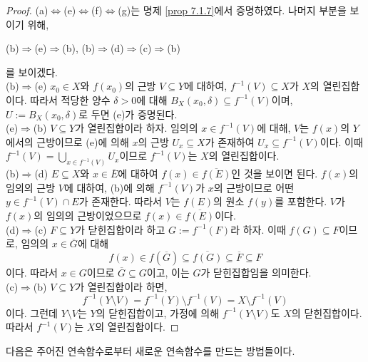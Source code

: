 \documentclass[11pt]{book}
\numberwithin{equation}{chapter}
\theoremstyle{definition}
\begin{document}
\begin{proof}
    (a)\(\Leftrightarrow\)(e)\(\Leftrightarrow\)(f)\(\Leftrightarrow\)(g)는 명제 \ref{prop 7.1.7}에서 증명하였다. 나머지 부분을 보이기 위해,
    \begin{center}
        (b)\(\Rightarrow\)(e)\(\Rightarrow\)(b), \quad (b)\(\Rightarrow\)(d)\(\Rightarrow\)(c)\(\Rightarrow\)(b)
    \end{center}
    를 보이겠다.\\
    (b)\(\Rightarrow\)(e) \(x_0 \in X\)와 \(f(x_0)\)의 근방 \(V \subseteq Y\)에 대하여, \(f^{-1}(V) \subseteq X\)가 \(X\)의 열린집합이다. 따라서 적당한 양수 \(\delta > 0\)에 대해 \(B_X(x_0, \delta) \subseteq f^{-1}(V)\)이며, \(U := B_X(x_0, \delta)\)로 두면 (e)가 증명된다.\\
    (e)\(\Rightarrow\)(b) \(V \subseteq Y\)가 열린집합이라 하자. 임의의 \(x \in f^{-1}(V)\)에 대해, \(V\)는 \(f(x)\)의 \(Y\)에서의 근방이므로 (e)에 의해 \(x\)의 근방 \(U_x \subseteq X\)가 존재하여 \(U_x \subseteq f^{-1}(V)\)이다. 이때 \(f^{-1}(V) = \bigcup_{x \in f^{-1}(V)} U_x\)이므로 \(f^{-1}(V)\)는 \(X\)의 열린집합이다.\\
    (b)\(\Rightarrow\)(d) \(E \subseteq X\)와 \(x \in \overline{E}\)에 대하여 \(f(x) \in \overline{f(E)}\)인 것을 보이면 된다. \(f(x)\)의 임의의 근방 \(V\)에 대하여, (b)에 의해 \(f^{-1}(V)\)가 \(x\)의 근방이므로 어떤 \(y \in f^{-1}(V) \cap E\)가 존재한다. 따라서 \(V\)는 \(f(E)\)의 원소 \(f(y)\)를 포함한다. \(V\)가 \(f(x)\)의 임의의 근방이었으므로 \(f(x) \in \overline{f(E)}\)이다.\\
    (d)\(\Rightarrow\)(c) \(F \subseteq Y\)가 닫힌집합이라 하고 \(G := f^{-1}(F)\)라 하자. 이때 \(f(G) \subseteq F\)이므로, 임의의 \(x \in \overline{G}\)에 대해
    \[
    f(x) \in f(\overline{G}) \subseteq \overline{f(G)} \subseteq \overline{F} \subseteq F    
    \]
    이다. 따라서 \(x \in G\)이므로 \(\overline{G} \subseteq G\)이고, 이는 \(G\)가 닫힌집합임을 의미한다.\\
    (c)\(\Rightarrow\)(b) \(V \subseteq Y\)가 열린집합이라 하면,
    \[
    f^{-1}(Y \setminus V) = f^{-1}(Y) \setminus f^{-1}(V) = X \setminus f^{-1}(V) 
    \]
    이다. 그런데 \(Y \setminus V\)는 \(Y\)의 닫힌집합이고, 가정에 의해 \(f^{-1}(Y \setminus V)\)도 \(X\)의 닫힌집합이다. 따라서 \(f^{-1}(V)\)는 \(X\)의 열린집합이다. 
\end{proof}


다음은 주어진 연속함수로부터 새로운 연속함수를 만드는 방법들이다. 
\end{document}
